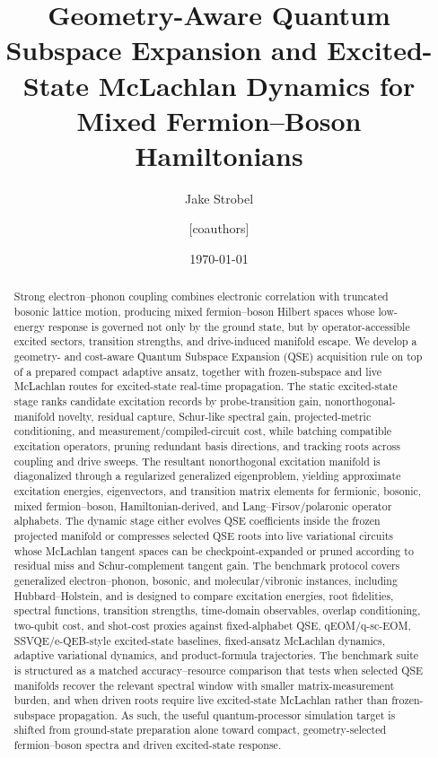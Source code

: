 \documentclass[
  reprint,
  amsmath,
  amssymb,
  aps,
  pra,
  nofootinbib,
  superscriptaddress,
  floatfix
]{revtex4-2}
\newcommand{\placeholder}[1]{\textcolor{red!70!black}{\ifmmode\left[#1\right]\else\textsf{[#1]}\fi}}
\begin{document}
\title{Geometry-Aware Quantum Subspace Expansion and Excited-State McLachlan Dynamics for Mixed Fermion--Boson Hamiltonians}

\author{Jake Strobel}
\author{\placeholder{coauthors}}

\date{\today}

\begin{abstract}
Strong electron--phonon coupling combines electronic correlation with truncated bosonic lattice motion, producing mixed fermion--boson Hilbert spaces whose low-energy response is governed not only by the ground state, but by operator-accessible excited sectors, transition strengths, and drive-induced manifold escape.  We develop a geometry- and cost-aware Quantum Subspace Expansion (QSE) acquisition rule on top of a prepared compact adaptive ansatz, together with frozen-subspace and live McLachlan routes for excited-state real-time propagation.  The static excited-state stage ranks candidate excitation records by probe-transition gain, nonorthogonal-manifold novelty, residual capture, Schur-like spectral gain, projected-metric conditioning, and measurement/compiled-circuit cost, while batching compatible excitation operators, pruning redundant basis directions, and tracking roots across coupling and drive sweeps.  The resultant nonorthogonal excitation manifold is diagonalized through a regularized generalized eigenproblem, yielding approximate excitation energies, eigenvectors, and transition matrix elements for fermionic, bosonic, mixed fermion--boson, Hamiltonian-derived, and Lang--Firsov/polaronic operator alphabets.  The dynamic stage either evolves QSE coefficients inside the frozen projected manifold or compresses selected QSE roots into live variational circuits whose McLachlan tangent spaces can be checkpoint-expanded or pruned according to residual miss and Schur-complement tangent gain.  The benchmark protocol covers generalized electron--phonon, bosonic, and molecular/vibronic instances, including Hubbard--Holstein, and is designed to compare excitation energies, root fidelities, spectral functions, transition strengths, time-domain observables, overlap conditioning, two-qubit cost, and shot-cost proxies against fixed-alphabet QSE, qEOM/q-sc-EOM, SSVQE/e-QEB-style excited-state baselines, fixed-ansatz McLachlan dynamics, adaptive variational dynamics, and product-formula trajectories.  The benchmark suite is structured as a matched accuracy--resource comparison that tests when selected QSE manifolds recover the relevant spectral window with smaller matrix-measurement burden, and when driven roots require live excited-state McLachlan rather than frozen-subspace propagation.  As such, the useful quantum-processor simulation target is shifted from ground-state preparation alone toward compact, geometry-selected fermion--boson spectra and driven excited-state response.
\end{abstract}
\end{document}
